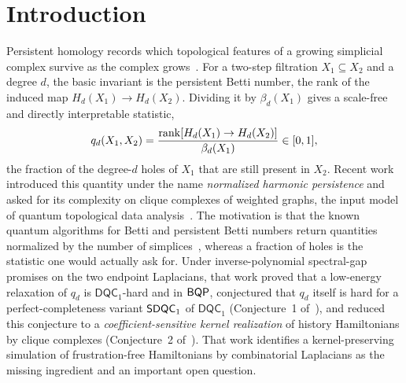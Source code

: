 \section{Introduction}
\label{sec:intro}

Persistent homology records which topological features of a growing simplicial complex survive as the complex grows~\cite{edelsbrunner2002topological,zomorodian2005computing,carlsson2009topology}. For a two-step filtration \(X_1\subseteq X_2\) and a degree \(d\), the basic invariant is the persistent Betti number, the rank of the induced map \(H_d(X_1)\to H_d(X_2)\). Dividing it by \(\beta_d(X_1)\) gives a scale-free and directly interpretable statistic,
\begin{equation}
\label{eq:intro-ratio}
q_d(X_1,X_2)=\frac{\operatorname{rank}[H_d(X_1)\to H_d(X_2)]}{\beta_d(X_1)}\in[0,1],
\end{equation}
the fraction of the degree-\(d\) holes of \(X_1\) that are still present in \(X_2\). Recent work~\cite{lowe2026normalized} introduced this quantity under the name \emph{normalized harmonic persistence} and asked for its complexity on clique complexes of weighted graphs, the input model of quantum topological data analysis~\cite{lloyd2016quantum,hayakawa2022quantum,gyurik2022towards,berry2024analyzing,mcardle2026streamlined}. The motivation is that the known quantum algorithms for Betti and persistent Betti numbers return quantities normalized by the number of simplices~\cite{lloyd2016quantum,hayakawa2022quantum,schmidhuber2023limitations,apers2023simple}, whereas a fraction of holes is the statistic one would actually ask for. Under inverse-polynomial spectral-gap promises on the two endpoint Laplacians, that work proved that a low-energy relaxation of \(q_d\) is \(\mathsf{DQC}_1\)-hard and in \(\mathsf{BQP}\), conjectured that \(q_d\) itself is hard for a perfect-completeness variant \(\mathsf{SDQC}_{1}\) of \(\mathsf{DQC}_1\) (Conjecture~1 of~\cite{lowe2026normalized}), and reduced this conjecture to a \emph{coefficient-sensitive kernel realization} of history Hamiltonians by clique complexes (Conjecture~2 of~\cite{lowe2026normalized}). That work identifies a kernel-preserving simulation of frustration-free Hamiltonians by combinatorial Laplacians as the missing ingredient and an important open question.

